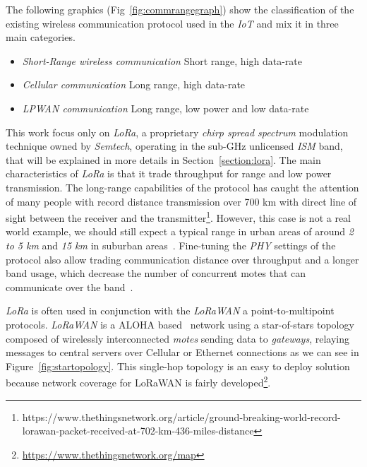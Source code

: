 The following graphics (Fig~\ref{fig:commrangegraph}) show the classification
of the existing wireless communication protocol used in the \emph{IoT} and mix
it in three main categories.

\begin{itemize}
    \item \emph{Short-Range wireless communication} Short range, high data-rate
    \item \emph{Cellular communication} Long range, high data-rate
    \item \emph{LPWAN communication} Long range, low power and low data-rate
\end{itemize}



This work focus only on \emph{LoRa}, a proprietary \emph{chirp spread spectrum}
modulation technique owned by \emph{Semtech}, operating in the sub-GHz
unlicensed \emph{ISM} band, that will be explained in more details in 
Section~\ref{section:lora}.
The main characteristics of \emph{LoRa} is that it trade throughput for range
and low power transmission. 
The long-range capabilities of the protocol has caught the attention of
many people with record distance transmission over 700 km
with direct line of sight between the receiver and the
transmitter\footnote{https://www.thethingsnetwork.org/article/ground-breaking-world-record-lorawan-packet-received-at-702-km-436-miles-distance}.
However, this case is not a real world example, we should still expect a typical 
range in urban areas of around \emph{2 to 5 km} and \emph{15 km} in suburban
areas~\cite{8030482}. Fine-tuning the \emph{PHY} settings of the protocol also
allow trading communication distance over throughput and a longer band usage,
which decrease the number of concurrent motes that can communicate over the
band~\cite{10.1145/2988287.2989163}.

\emph{LoRa} is often used in conjunction with the \emph{LoRaWAN} a 
point-to-multipoint protocols.
\emph{LoRaWAN} is a ALOHA based~\cite{loraalliance:lorawanspecification} network
using a star-of-stars topology composed of wirelessly interconnected 
\emph{motes} sending data to \emph{gateways}, relaying messages to central 
servers over Cellular or Ethernet connections as we can see in 
Figure~\ref{fig:startopology}.
This single-hop topology is an easy to deploy solution because network coverage
for LoRaWAN is fairly
developed\footnote{\url{https://www.thethingsnetwork.org/map}}.

